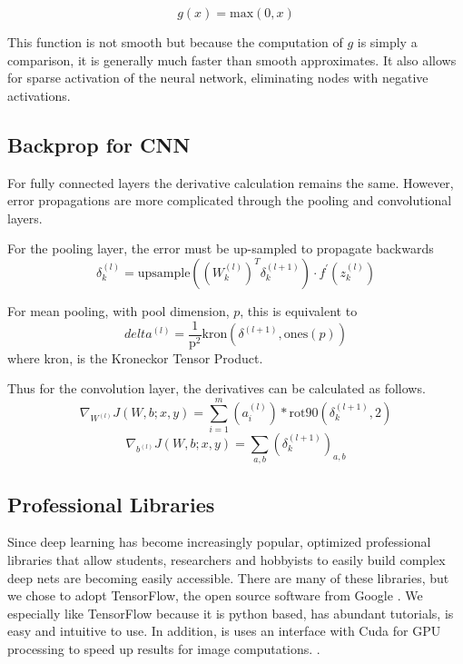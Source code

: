 \documentclass[12pt, twocolumn]{article}
\begin{document}
\begin{equation}
g(x)= \textrm{max}(0,x)
\end{equation}

This function is not smooth but because the computation of $g$ is simply a comparison, it is generally much faster than smooth approximates. It also allows for sparse activation of the neural network, eliminating nodes with negative activations. 

\subsection{Backprop for CNN}
For fully connected layers  the derivative calculation remains the same. However,  error propagations are more complicated through the pooling and convolutional layers. 

For the pooling layer, the error must be up-sampled to propagate backwards
\begin{equation}
\delta^{(l)}_k=\textrm{upsample}((W^{(l)}_k)^T \delta^{(l+1)}_k) \cdot f^{\prime}(z^{(l)}_k)
\end{equation}


For mean pooling, with pool dimension, $p$, this is equivalent to 
\begin{equation}
delta^{(l)}= \frac{1}{\textrm{p}^2}  \textrm{kron}(\delta^{(l+1)}, \textrm{ones}(p))
\end{equation}
where kron, is the Kroneckor Tensor Product.

Thus for the convolution layer, the derivatives can be calculated as follows.
\begin{equation}
\nabla_{W^{(l)}}J(W,b;x,y) = \sum_{i=1}^m (a^{(l)}_i) \ast \textrm{rot90}( \delta^{(l+1)}_k,2)
\end{equation}
\begin{equation}
\nabla_{b^{(l)}}J(W,b;x,y)= \sum_{a,b}(\delta^{(l+1)}_k)_{a,b}
\end{equation}


\subsection{Professional Libraries}

Since deep learning has become increasingly popular, optimized professional libraries that allow students, researchers and hobbyists to easily build complex deep nets are becoming easily accessible. There are many of these libraries, but we chose to adopt TensorFlow, the open source software from Google \cite{TensorFlowGH}. We especially like TensorFlow because it is python based, has abundant tutorials, is easy and intuitive to use. In addition, is uses an interface with Cuda for GPU processing to speed up results for image computations. \cite{TensorFlowWeb}. 
\end{document}
